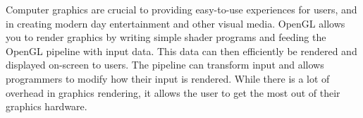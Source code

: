 \documentclass{article}
\begin{document}
Computer graphics are crucial to providing easy-to-use experiences for users, and in creating modern day entertainment and other visual media. OpenGL allows you to render graphics by writing simple shader programs and feeding the OpenGL pipeline with input data. This data can then efficiently be rendered and displayed on-screen to users. The pipeline can transform input and allows programmers to modify how their input is rendered. While there is a lot of overhead in graphics rendering, it allows the user to get the most out of their graphics hardware.

\clearpage

{}

\end{document}
